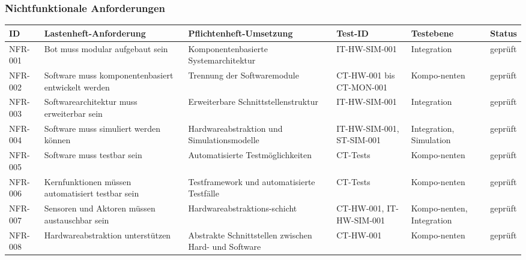 \subsubsection{Nichtfunktionale
Anforderungen}\label{nichtfunktionale-anforderungen}

\begin{longtable}[]{@{}
  >{\raggedright\arraybackslash}p{}
  >{\raggedright\arraybackslash}p{}
  >{\raggedright\arraybackslash}p{}
  >{\raggedright\arraybackslash}p{}
  >{\raggedright\arraybackslash}p{}
  >{\raggedright\arraybackslash}p{}@{}}
\toprule\noalign{}
\begin{minipage}[b]{\linewidth}\raggedright
ID
\end{minipage} & \begin{minipage}[b]{\linewidth}\raggedright
Lastenheft-Anforderung
\end{minipage} & \begin{minipage}[b]{\linewidth}\raggedright
Pflichtenheft-Umsetzung
\end{minipage} & \begin{minipage}[b]{\linewidth}\raggedright
Test-ID
\end{minipage} & \begin{minipage}[b]{\linewidth}\raggedright
Testebene
\end{minipage} & \begin{minipage}[b]{\linewidth}\raggedright
Status
\end{minipage} \\
\midrule\noalign{}
\endhead
\bottomrule\noalign{}
\endlastfoot
NFR-001 & Bot muss modular aufgebaut sein & Komponentenbasierte
Systemarchitektur & IT-HW-SIM-001 & Integration & geprüft \\
NFR-002 & Software muss komponentenbasiert entwickelt werden & Trennung
der Softwaremodule & CT-HW-001 bis CT-MON-001 & Kompo-nenten &
geprüft \\
NFR-003 & Softwarearchitektur muss erweiterbar sein & Erweiterbare
Schnittstellenstruktur & IT-HW-SIM-001 & Integration & geprüft \\
NFR-004 & Software muss simuliert werden können & Hardwareabstraktion
und Simulationsmodelle & IT-HW-SIM-001, ST-SIM-001 & Integration,
Simulation & geprüft \\
NFR-005 & Software muss testbar sein & Automatisierte Testmöglichkeiten
& CT-Tests & Kompo-nenten & geprüft \\
NFR-006 & Kernfunktionen müssen automatisiert testbar sein &
Testframework und automatisierte Testfälle & CT-Tests & Kompo-nenten &
geprüft \\
NFR-007 & Sensoren und Aktoren müssen austauschbar sein &
Hardwareabstraktions-schicht & CT-HW-001, IT-HW-SIM-001 & Kompo-nenten,
Integration & geprüft \\
NFR-008 & Hardwareabstraktion unterstützen & Abstrakte Schnittstellen
zwischen Hard- und Software & CT-HW-001 & Kompo-nenten & geprüft \\
\end{longtable}

